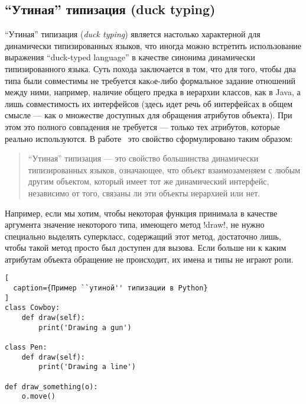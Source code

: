 \subsection{``Утиная'' типизация (duck typing)}

``Утиная'' типизация (\emph{duck typing}) является настолько характерной для
динамически типизированных языков, что иногда можно встретить использование
выражения ``duck-typed language'' в качестве синонима динамически
типизированного языка. Суть похода заключается в том, что для того, чтобы два
типа были совместимы не требуется какoе-либо формальное задание отношений между
ними, например, наличие общего предка в иерархии классов, как в Java, а лишь
совместимость их интерфейсов (здесь идет речь об интерфейсах в общем смысле ---
как о множестве доступных для обращения атрибутов объекта). При этом это полного
совпадения не требуется --- только тех атрибутов, которые реально используются.
В работе~\cite{Ortin2011:union} это свойство сформулировано таким образом:

\begin{quote}
    
    ``Утиная'' типизация --- это свойство большинства динамически типизированных
    языков, означающее, что объект взаимозаменяем с любым другим объектом,
    который имеет тот же динамический интерфейс, независимо от того, связаны ли
    эти объекты иерархией или нет.
\end{quote}

Например, если мы хотим, чтобы некоторая функция принимала в качестве аргумента
значение некоторого типа, имеющего метод !draw!, не нужно специально выделять
суперкласс, содержащий этот метод, достаточно лишь, чтобы такой метод просто был
доступен для вызова. Если больше ни к каким атрибутам объекта обращение не
происходит, их имена и типы не играют роли. 

\begin{lstlisting}[
  caption={Пример ``утиной'' типизации в Python}
]
class Cowboy:
    def draw(self):
        print('Drawing a gun')

class Pen:
    def draw(self):
        print('Drawing a line')

def draw_something(o):
    o.move()
\end{lstlisting}

